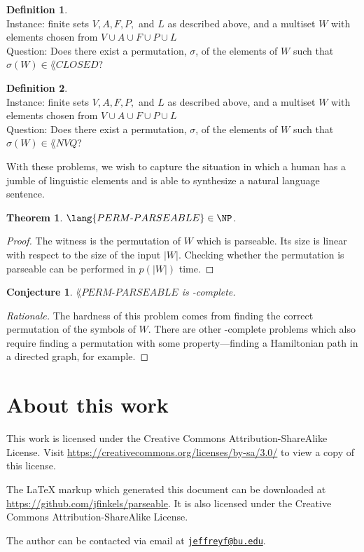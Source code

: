\documentclass[draft]{article}
\newtheorem{theorem}{Theorem}
\newtheorem{conjecture}{Conjecture}
\newenvironment{rationale}{\begin{proof}[Rationale]}{\end{proof}}
\theoremstyle{remark} \newtheorem{technicality}{Technical note}
\theoremstyle{definition} \newtheorem{definition}{Definition}
\newcommand{\email}[1]{\href{mailto:#1}{\nolinkurl{#1}}} %
\newenvironment{langdef}[1]{\begin{definition}{\lang{#1}}}{\end{definition}}
\newenvironment{instance}{\\Instance:}{}
\newenvironment{question}{\\Question:}{}
\newcommand{\pp}{PERM\mbox{-}PARSEABLE}
\newcommand{\pc}{PERM\mbox{-}CLOSED}
\newcommand{\pn}{PERM\mbox{-}NVQ}
\begin{document}
\begin{langdef}{\pc}
  \begin{instance}
    finite sets $V, A, F, P,$ and $L$ as described above, and a multiset $W$ with elements chosen from $V\cup A\cup F\cup P\cup L$
  \end{instance}
  \begin{question}
    Does there exist a permutation, $\sigma$, of the elements of $W$ such that $\sigma(W)\in\lang{CLOSED}$?
  \end{question}
\end{langdef}

\begin{langdef}{\pn}
  \begin{instance}
    finite sets $V, A, F, P,$ and $L$ as described above, and a multiset $W$ with elements chosen from $V\cup A\cup F\cup P\cup L$
  \end{instance}
  \begin{question}
    Does there exist a permutation, $\sigma$, of the elements of $W$ such that $\sigma(W)\in\lang{NVQ}$?
  \end{question}
\end{langdef}

With these problems, we wish to capture the situation in which a human has a jumble of linguistic elements and is able to synthesize a natural language sentence.

\begin{theorem}
  $\lang{\pp}\in\NP$.
\end{theorem}
\begin{proof}
  The witness is the permutation of $W$ which is parseable.
  Its size is linear with respect to the size of the input $|W|$.
  Checking whether the permutation is parseable can be performed in $p(|W|)$ time.
\end{proof}

\begin{conjecture}
  $\lang{\pp}$ is \NP-complete.
\end{conjecture}
\begin{rationale}
  The hardness of this problem comes from finding the correct permutation of the symbols of $W$.
  There are other \NP-complete problems which also require finding a permutation with some property---finding a Hamiltonian path in a directed graph, for example.
\end{rationale}

\section{About this work}

This work is licensed under the Creative Commons Attribution-ShareAlike License.
Visit \mbox{\url{https://creativecommons.org/licenses/by-sa/3.0/}} to view a copy of this license.

The \LaTeX{} markup which generated this document can be downloaded at \mbox{\url{https://github.com/jfinkels/parseable}}.
It is also licensed under the Creative Commons Attribution-ShareAlike License.

The author can be contacted via email at \email{jeffreyf@bu.edu}.



\end{document}
